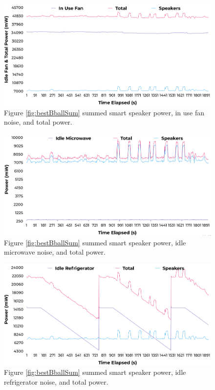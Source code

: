 \begin{figure}[H]
  \centering
  \includegraphics[width=1\textwidth]{figures/inUseFanNoise.png}
  \caption{Figure \ref{fig:bestBballSum} summed smart speaker power, in use fan noise, and total power.}
  \label{fig:fanIdle}
\end{figure}

\begin{figure}[H]
  \centering
  \includegraphics[width=1\textwidth]{figures/idleuWaveNoise.png}
  \caption{Figure \ref{fig:bestBballSum} summed smart speaker power, idle microwave noise, and total power.}
  \label{fig:uWaveIdle}
\end{figure}

\begin{figure}[H]
  \centering
  \includegraphics[width=1\textwidth]{figures/idleFridgeNoise.png}
  \caption{Figure \ref{fig:bestBballSum} summed smart speaker power, idle refrigerator noise, and total power.}
  \label{fig:fridgeIdle}
\end{figure}

